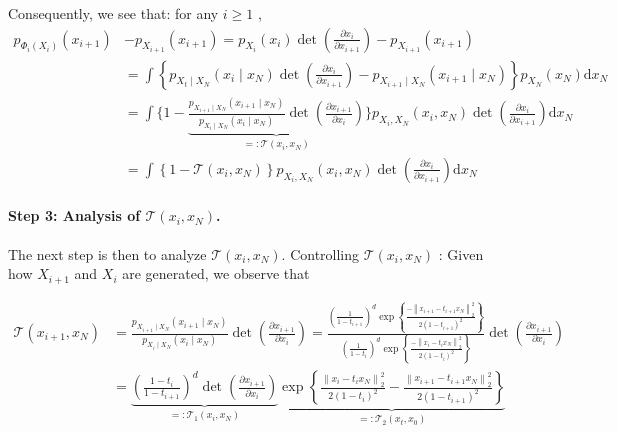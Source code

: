 \documentclass{article}
\theoremstyle{plain}
\theoremstyle{definition}
\theoremstyle{remark}
\def\cT{\mathcal{T}}
\begin{document}
Consequently, we see that: for any $i \geq 1$ %
,
\begin{equation}
\label{eq: TV distance p_phi_i and p_i+1}
\begin{aligned}
p_{{\Phi}_{i}\left(X_{i}\right)}\left(x_{i+1}\right) & -p_{X_{i+1}}\left(x_{i+1}\right)=p_{X_{i}}\left(x_{i}\right) \operatorname{det}\left(\frac{\partial x_{i}}{\partial x_{i+1}}\right)-p_{X_{i+1}}\left(x_{i+1}\right) \\
& =\int\left\{p_{X_{t} \mid X_N}\left(x_{i} \mid x_N\right) \operatorname{det}\left(\frac{\partial x_{i}}{\partial x_{i+1}}\right)-p_{X_{i+1} \mid X_N}\left(x_{i+1} \mid x_N\right)\right\} p_{X_N}\left(x_N\right) \mathrm{d} x_N \\
& =\int \Big\{1-\underbrace{\frac{p_{X_{i+1} \mid X_N}\left(x_{i+1} \mid x_N\right)}{p_{X_{i} \mid X_N}\left(x_{i} \mid x_N\right)} \operatorname{det}\left(\frac{\partial x_{i+1}}{\partial x_{i}}\right)}_{=: \mathcal{T}\left(x_{i}, x_N\right)}\Big\} p_{X_{i}, X_N}\left(x_{i}, x_N\right) \operatorname{det}\left(\frac{\partial x_{i}}{\partial x_{i+1}}\right) \mathrm{d} x_N  \\
& =\int\left\{1-\mathcal{T}\left(x_{i}, x_N\right)\right\} p_{X_{i}, X_N}\left(x_{i}, x_N\right) \operatorname{det}\left(\frac{\partial x_{i}}{\partial x_{i+1}}\right) \mathrm{d} x_N
\end{aligned}
\end{equation}

\paragraph{Step 3: Analysis of $\cT(x_i, x_N)$.}
The next step is then to analyze $\mathcal{T}\left(x_{i}, x_N\right)$.
Controlling $\mathcal{T}\left(x_{i}, x_N\right)$ : Given how $X_{i+1}$ and $X_{i}$ are generated, we observe that

\begin{align*}
\mathcal{T}\left(x_{i+1}, x_N\right) & =\frac{p_{X_{i+1} \mid X_N}\left(x_{i+1} \mid x_N\right)}{p_{X_{i} \mid X_{N}}\left(x_{i} \mid x_N\right)} \operatorname{det}\left(\frac{\partial x_{i+1}}{\partial x_{i}}\right)=\frac{\left(\frac{1}{1-t_{i+1}}\right)^{d} \exp \left\{\frac{-\left\|x_{i+1}-t_{i+1}x_N\right\|_{2}^{2}}{2\left(1-t_{i+1}\right)^2}\right\}}{\left(\frac{1}{1-t_i}\right)^{d} \exp \left\{\frac{-\left\|x_{i}-t_i x_N\right\|_{2}^{2}}{2\left(1-t_i\right)^2}\right\}} \operatorname{det}\left(\frac{\partial x_{i+1}}{\partial x_{i}}\right) \\
& =\underbrace{\left(\frac{1-t_i}{1-t_{i+1}}\right)^{d} \operatorname{det}\left(\frac{\partial x_{i+1}}{\partial x_{i}}\right)}_{=: \mathcal{T}_{1}\left(x_{i}, x_N\right)} \underbrace{\exp \left\{\frac{\left\|x_{i}-t_i x_N\right\|_{2}^{2}}{2\left(1-t_i\right)^2}-\frac{\left\|x_{i+1}-t_{i+1}x_N\right\|_{2}^{2}}{2\left(1-t_{i+1}\right)^2}\right\}}_{=: \mathcal{T}_{2}\left(x_{t}, x_{0}\right)}
\end{align*}
\end{document}

